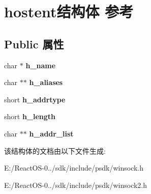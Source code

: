 \hypertarget{structhostent}{}\section{hostent结构体 参考}
\label{structhostent}
\subsection*{Public 属性}
\begin{DoxyCompactItemize}
\item 
\mbox{\label{structhostent_a2673b3effc9688880551140d4d683454}} 
char $\ast$ {\bfseries h\+\_\+name}
\item 
\mbox{\label{structhostent_a4531fae316926d6a9f9ea3c5c9c673ec}} 
char $\ast$$\ast$ {\bfseries h\+\_\+aliases}
\item 
\mbox{\label{structhostent_a4c4fd6f58cddc614690127b5a03bf7c2}} 
short {\bfseries h\+\_\+addrtype}
\item 
\mbox{\label{structhostent_a26ab8713705b131ee5b3221339941e5a}} 
short {\bfseries h\+\_\+length}
\item 
\mbox{\label{structhostent_a724d319362cb1558e899960ba17ad953}} 
char $\ast$$\ast$ {\bfseries h\+\_\+addr\+\_\+list}
\end{DoxyCompactItemize}


该结构体的文档由以下文件生成\+:\begin{DoxyCompactItemize}
\item 
E\+:/\+React\+O\+S-\/0../sdk/include/psdk/winsock.\+h\item 
E\+:/\+React\+O\+S-\/0../sdk/include/psdk/winsock2.\+h\end{DoxyCompactItemize}
